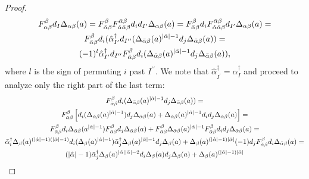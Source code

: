 \begin{cor}
\begin{proof}
  \begin{gather*}
    F_{\alpha\beta}^\beta d_I \Delta_{\alpha\beta}(a) = %
    F_{\bar\alpha\beta}^{\beta} F^{\bar\alpha\beta}_{\hat\alpha\bar\alpha\beta} d_i  d_{I^\prime} \Delta_{\alpha\beta}(a) = %
    F_{\bar\alpha\beta}^{\beta} d_i F^{\bar\alpha\beta}_{\hat\alpha\bar\alpha\beta}%
      d_{I^\prime} \Delta_{\alpha\beta}(a) = \\%
    F_{\bar\alpha\beta}^{\beta} d_i ( \hat\alpha^\dagger_{I^\prime} d_{I^{\prime\prime}}%
      ( \Delta_{\bar\alpha\beta}(a)^{\abs{\hat\alpha}-1} %
      d_j \Delta_{\bar\alpha\beta}(a) ) = \\%
    (-1)^l \hat\alpha^\dagger_{I^\prime} d_{I^{\prime\prime}} F_{\bar\alpha\beta}^\beta %
      d_i ( \Delta_{\bar\alpha\beta}(a)^{\abs{\hat\alpha}-1} %
      d_j \Delta_{\bar\alpha\beta}(a) ),%
  \end{gather*}
  where $l$ is the sign of permuting $i$ past $I^{\prime\prime}$. We note that $\hat\alpha^\dagger_{I^\prime} = \alpha^\dagger_I$ and proceed to analyze only the right part of the last term:
  \begin{gather*}
    F_{\bar\alpha\beta}^\beta d_i ( \Delta_{\bar\alpha\beta}(a)^{\abs{\hat\alpha}-1} %
      d_j \Delta_{\bar\alpha\beta}(a) ) = \\%
    F_{\bar\alpha\beta}^\beta \left[ %
      d_i ( \Delta_{\bar\alpha\beta}(a)^{\abs{\hat\alpha}-1} )%
      d_j \Delta_{\bar\alpha\beta}(a) + %
      \Delta_{\bar\alpha\beta}(a)^{\abs{\hat\alpha}-1} %
      d_i d_j \Delta_{\bar\alpha\beta}(a) \right] = \\
    F_{\bar\alpha\beta}^\beta d_i \Delta_{\bar\alpha\beta}(a^{\abs{\hat\alpha}-1}) %
      F_{\bar\alpha\beta}^\beta d_j \Delta_{\bar\alpha\beta}(a) + %
      F_{\bar\alpha\beta}^\beta \Delta_{\bar\alpha\beta}(a)^{\abs{\hat\alpha}-1} %
      F_{\bar\alpha\beta}^\beta d_i d_j \Delta_{\bar\alpha\beta}(a) = \\%
    \bar\alpha^\dagger_i %
      \Delta_{\beta} (a)^{(\abs{\hat\alpha}-1)(\abs{\bar\alpha}-1)} %
      d_i (\Delta_{\beta} (a)^{\abs{\hat\alpha}-1}) %
      \bar\alpha^\dagger_j %
      \Delta_{\beta} (a)^{\abs{\bar\alpha}-1} %
      d_j \Delta_\beta (a) %
      + %
      \Delta_\beta(a)^{(\abs{\hat\alpha}-1)\abs{\bar\alpha}} %
      (-1) d_j F_{\bar\alpha\beta}^\beta %
      d_i \Delta_{\bar\alpha\beta}(a) = \\%
    (\abs{\hat\alpha}-1)\bar\alpha^\dagger_j%
      \Delta_\beta(a)^{\abs{\hat\alpha}\abs{\bar\alpha} - 2} %
      d_i \Delta_\beta(a) d_j \Delta_\beta (a) %
      + %
      \Delta_\beta(a)^{(\abs{\hat\alpha}-1)\abs{\bar\alpha}} %

\end{gather*}
\end{proof}
\end{cor}
